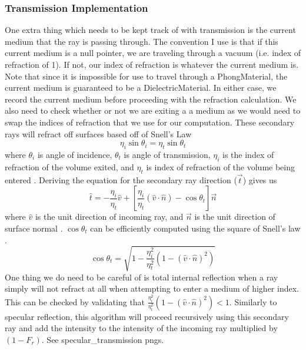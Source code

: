 \documentclass {article}
\begin{document}
\subsubsection{Transmission Implementation}
One extra thing which needs to be kept track of with transmission is the current medium that 
the ray is passing through. The convention I use is that if this current medium is a null pointer, 
we are traveling through a vacuum (i.e. index of refraction of 1). If not, our index of refraction is whatever
the current medium is. Note that since it is impossible for use to travel through a PhongMaterial, the 
current medium is guaranteed to be a DielectricMaterial. In either case, we record the current medium 
before proceeding with the refraction calculation. We also need to check whether or not we are exiting a
a medium as we would need to swap the indices of refraction that we use for our computation.
These secondary
rays will refract off surfaces based off of Snell's Law
$$\eta_i\sin\theta_i=\eta_t\sin\theta_t$$
where $\theta_i$ is angle of incidence, $\theta_t$ is angle of transmission,
$\eta_i$ is the index of refraction of the volume exited, and $\eta_t$ is
index of refraction of the volume being entered \cite{PBR}. Deriving
the equation for the secondary ray direction ($\vec{t}$) gives us
$$\hat{t}=-\frac{\eta_i}{\eta_t}\hat{v}+\left[\frac{\eta_i}{\eta_t}(\hat{v}\cdot\hat{n})-\cos\theta_t\right]\vec{n}$$
where $\hat{v}$ is the unit
direction of incoming ray, and $\vec{n}$ is the unit direction of surface normal \cite{PBR}.
$\cos\theta_t$ can be efficiently computed using the square of Snell's law \cite{PBR}.
$$\cos\theta_t=\sqrt{1-\frac{\eta_i^2}{\eta_t^2}(1-(\hat{v}\cdot\hat{n})^2)}$$
One thing we do need to be careful of is total internal reflection when a ray
simply will not refract at all when attempting to enter a medium of higher index.
This can be checked by validating that $\frac{\eta_i^2}{\eta_t^2}(1-(\hat{v}\cdot\hat{n})^2)<1$.
Similarly to specular reflection, this algorithm will proceed recursively using this
secondary ray and add the intensity to the intensity of the incoming ray multiplied by $(1-F_r)$.
See specular\_transmission pngs.
\end{document}
